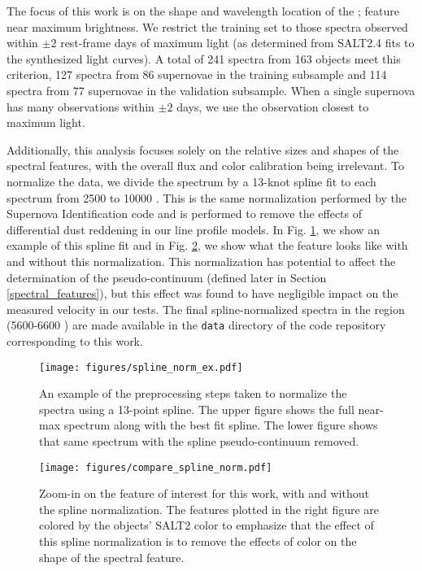 The focus of this work is on the shape and wavelength location of the \siliconii; feature near maximum brightness. We restrict the training set to those spectra observed within $\pm 2$ rest-frame days of maximum light (as determined from SALT2.4 fits to the synthesized light curves). A total of 241 spectra from 163 objects meet this criterion, 127 spectra from 86 supernovae in the training subsample and 114 spectra from 77 supernovae in the validation subsample. When a single supernova has many observations within $\pm 2$ days, we use the observation closest to maximum light.

Additionally, this analysis focuses solely on the relative sizes and shapes of the spectral features, with the overall flux and color calibration being irrelevant. To normalize the data, we divide the spectrum by a 13-knot spline fit to each spectrum from 2500 \angstrom\; to 10000 \angstrom. This is the same normalization performed by the Supernova Identification code \citep[SNID,][]{blondin_type_2007} and is performed to remove the effects of differential dust reddening in our line profile models. In Fig. \ref{spline_norm_ex}, we show an example of this spline fit and in Fig. \ref{compare_spline_norm}, we show what the \siliconii\; feature looks like with and without this normalization. This normalization has potential to affect the determination of the pseudo-continuum (defined later in Section \ref{spectral_features}), but this effect was found to have negligible impact on the measured velocity in our tests. The final spline-normalized spectra in the \siliconii\; region (5600-6600 \angstrom) are made available in the \verb|data| directory of the code repository corresponding to this work.

\begin{figure}
    \centering
    \texttt{[image: figures/spline\_norm\_ex.pdf]}
    \caption{An example of the preprocessing steps taken to normalize the spectra using a 13-point spline. The upper figure shows the full near-max spectrum along with the best fit spline. The lower figure shows that same spectrum with the spline pseudo-continuum removed.}
    \label{spline_norm_ex}
\end{figure}

\begin{figure}[!htb]
    \centering
    \texttt{[image: figures/compare\_spline\_norm.pdf]}
    \caption{Zoom-in on the feature of interest for this work, with and without the spline normalization. The features plotted in the right figure are colored by the objects' SALT2 color to emphasize that the effect of this spline normalization is to remove the effects of color on the shape of the spectral feature.}
    \label{compare_spline_norm}
\end{figure}

